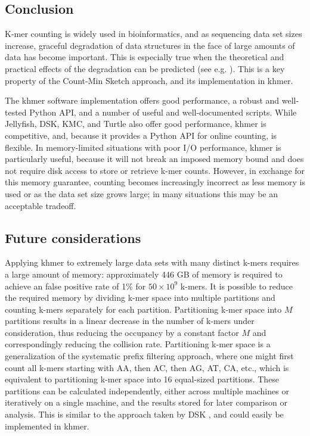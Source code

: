 \documentclass[10pt]{article}
\begin{document}
\subsection*{Conclusion}

K-mer counting is widely used in bioinformatics, and as sequencing
data set sizes increase, graceful degradation of data structures in
the face of large amounts of data has become important.  This is
especially true when the theoretical and practical effects of the
degradation can be predicted (see e.g. \cite{Melsted2011, Pell2012,
  Roy2014}).  This is a key property of the Count-Min Sketch approach,
and its implementation in khmer.

The khmer software implementation offers good performance, a robust
and well-tested Python API, and a number of useful and well-documented
scripts.  While Jellyfish, DSK, KMC, and Turtle also offer good
performance, khmer is competitive, and, because it provides a Python
API for online counting, is flexible.  In memory-limited situations
with poor I/O performance, khmer is particularly useful, because it
will not break an imposed memory bound and does not require disk
access to store or retrieve k-mer counts.  However, in exchange for
this memory guarantee, counting becomes increasingly incorrect as less
memory is used or as the data set size grows large; in many situations
this may be an acceptable tradeoff.

\subsection*{Future considerations}

Applying khmer to extremely large data sets with many distinct k-mers
requires a large amount of memory: approximately 446 GB of memory is
required to achieve an false positive rate of 1\% for $50\times 10^9$
k-mers. It is possible to reduce the required memory by dividing k-mer
space into multiple partitions and counting k-mers separately for each
partition. Partitioning k-mer space into $M$ partitions results in a
linear decrease in the number of k-mers under consideration, thus
reducing the occupancy by a constant factor $M$ and correspondingly
reducing the collision rate.  Partitioning k-mer space is a
generalization of the systematic prefix filtering approach, where one
might first count all k-mers starting with AA, then AC, then AG, AT,
CA, etc., which is equivalent to partitioning k-mer space into 16
equal-sized partitions. These partitions can be calculated
independently, either across multiple machines or iteratively on a
single machine, and the results stored for later comparison or
analysis.  This is similar to the approach taken by DSK
\cite{Rizk2013}, and could easily be implemented in khmer.
\end{document}
